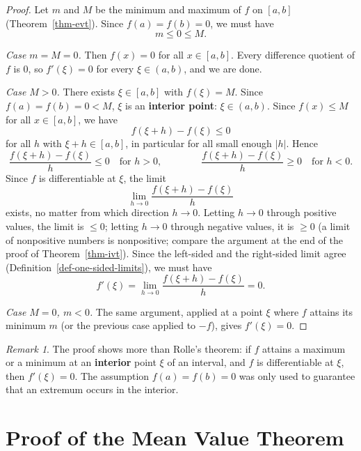 \documentclass[
  letterpaper,
  DIV=11,
  numbers=noendperiod]{scrreprt}
\theoremstyle{plain}
\theoremstyle{plain}
\theoremstyle{definition}
\theoremstyle{definition}
\theoremstyle{definition}
\theoremstyle{plain}
\theoremstyle{plain}
\theoremstyle{remark}
\newtheorem{refremark}{Remark}[chapter]
\begin{document}
\begin{proof}
Let \(m\) and \(M\) be the minimum and maximum of \(f\) on \([a,b]\)
(Theorem~\ref{thm-evt}). Since \(f(a)=f(b)=0\), we must have \[
m \le 0 \le M .
\]

\emph{Case \(m = M = 0\).} Then \(f(x)=0\) for all \(x\in[a,b]\). Every
difference quotient of \(f\) is \(0\), so \(f'(\xi) = 0\) for every
\(\xi\in(a,b)\), and we are done.

\emph{Case \(M>0\).} There exists \(\xi\in[a,b]\) with \(f(\xi)=M\).
Since \(f(a)=f(b)=0<M\), \(\xi\) is an \textbf{interior point}:
\(\xi\in(a,b)\). Since \(f(x)\le M\) for all \(x\in[a,b]\), we have \[
f(\xi+h) - f(\xi) \le 0
\] for all \(h\) with \(\xi+h\in[a,b]\), in particular for all small
enough \(\lvert h \rvert\). Hence \[
\frac{f(\xi+h)-f(\xi)}{h} \le 0 \quad\text{for } h>0,
\qquad\qquad
\frac{f(\xi+h)-f(\xi)}{h} \ge 0 \quad\text{for } h<0 .
\] Since \(f\) is differentiable at \(\xi\), the limit \[
\lim_{h\to0}\frac{f(\xi+h)-f(\xi)}{h}
\] exists, no matter from which direction \(h\to0\). Letting \(h\to0\)
through positive values, the limit is \(\le0\); letting \(h\to0\)
through negative values, it is \(\ge0\) (a limit of nonpositive numbers
is nonpositive; compare the argument at the end of the proof of
Theorem~\ref{thm-ivt}). Since the left-sided and the right-sided limit
agree (Definition~\ref{def-one-sided-limits}), we must have \[
f'(\xi) = \lim_{h\to0}\frac{f(\xi+h)-f(\xi)}{h} = 0 .
\]

\emph{Case \(M=0\), \(m<0\).} The same argument, applied at a point
\(\xi\) where \(f\) attains its minimum \(m\) (or the previous case
applied to \(-f\)), gives \(f'(\xi)=0\).
\end{proof}

\begin{refremark}
The proof shows more than Rolle's theorem: if \(f\) attains a maximum or
a minimum at an \textbf{interior} point \(\xi\) of an interval, and
\(f\) is differentiable at \(\xi\), then \(f'(\xi)=0\). The assumption
\(f(a)=f(b)=0\) was only used to guarantee that an extremum occurs in
the interior.

\label{rem-interior-extremum}

\end{refremark}

\section{Proof of the Mean Value
Theorem}\label{proof-of-the-mean-value-theorem}
\end{document}
